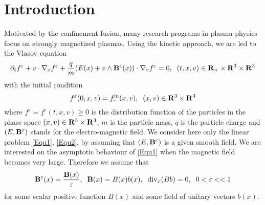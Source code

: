 \documentclass[12pt, a4paper]{article}
\providecommand\mathbb{\bf}
\newcommand\R{{\mathbb R}}
\newcommand{\eps}[0]{
\varepsilon}
\newcommand{\fe}[0]{
f ^\varepsilon}
\newcommand{\fine}[0]{
f ^{\mathrm{in}}_{\varepsilon}}
\newcommand{\Divx}[0]{
\mathrm{div}_x}
\newcommand{\bB}[0]{
{\bold B}}
\begin{document}
\section{Introduction}
\label{Intro}
\indent


Motivated by the confinement fusion, many research programs in plasma physics focus on strongly magnetized plasmas. Using the kinetic approach, we are led to the Vlasov equation
\begin{equation}
\label{Equ1} \partial _t \fe + v \cdot \nabla _x \fe + \frac{q}{m} ( E(x) + v \wedge \bB ^\eps (x) ) \cdot \nabla _v \fe = 0,\;\;(t,x,v) \in \R_+ \times \R ^3 \times \R ^3
\end{equation}
with the initial condition
\begin{equation}
\label{Equ2} \fe (0,x,v) = \fine (x,v),\;\;(x,v) \in \R ^3 \times \R ^3
\end{equation}
where $\fe = \fe (t,x,v) \geq 0$ is the distribution function of the particles in the phase space $(x,v) \in \R ^3 \times \R^3$, $m$ is the particle mass, $q$ is the particle charge and $(E, \bB ^\eps)$ stands for the electro-magnetic field. We consider here only the linear problem \eqref{Equ1}, \eqref{Equ2}, by assuming that $(E, \bB ^\eps)$ is a given smooth field. We are interested on the asymptotic behaviour of \eqref{Equ1} when the magnetic field becomes very large. Therefore we assume that
\[
\bB ^\eps (x) = \frac{\bB (x)}{\eps},\;\;\bB (x) = B(x) b(x),\;\;\Divx ( B b) = 0,\;\;0 < \eps <<1
\]
for some scalar positive function $B(x)$ and some field of unitary vectors $b(x)$. 
\end{document}
